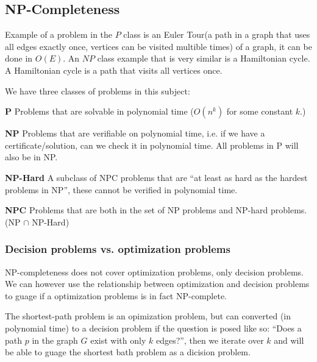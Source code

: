 \subsection{NP-Completeness}
Example of a problem in the $P$ class is an Euler Tour(a path in a graph that
uses all edges exactly once, vertices can be visited multible times) of a graph,
it can be done in $O(E)$. An $NP$ class example that is very similar is a
Hamiltonian cycle. A Hamiltonian cycle is a path that visits all vertices once.

We have three classes of problems in this subject:
\begin{itemize*}
\item[\textbf{P}] Problems that are solvable in polynomial time ($O(n^k)$ for
  some constant $k$.)
\item[\textbf{NP}] Problems that are verifiable on polynomial time, i.e. if we
  have a certificate/solution, can we check it in polynomial time. All problems
  in P will also be in NP.
\item[\textbf{NP-Hard}] A subclass of NPC problems that are ``at least as hard
  as the hardest problems in NP'', these cannot be verified in polynomial time.
\item[\textbf{NPC}] Problems that are both in the set of NP problems and NP-hard
  problems. (NP $\cap$ NP-Hard)
\end{itemize*}

\subsubsection{Decision problems vs. optimization problems}
NP-completeness does not cover optimization problems, only decision problems. We
can however use the relationship between optimization and decision problems to
guage if a optimization problems is in fact NP-complete.

The shortest-path problem is an opimization problem, but can converted (in
polynomial time) to a decision problem if the question is posed like so: ``Does
a path $p$ in the graph $G$ exist with only $k$ edges?'', then we iterate over
$k$ and will be able to guage the shortest bath problem as a dicision problem.

